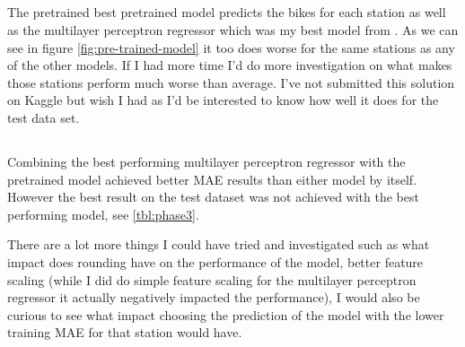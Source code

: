 \documentclass[a4paper]{article}
\begin{document}
    \subsection*{}
    The pretrained best pretrained model predicts the bikes for each station as well as the multilayer perceptron regressor
    which was my best model from .
    As we can see in figure \ref{fig:pre-trained-model} it too does worse for the same stations as any of the other models.
    If I had more time I'd do more investigation on what makes those stations perform much worse than average. I've not
    submitted this solution on Kaggle but wish I had as I'd be interested to know how well it does for the test data set.

    \subsection*{}
    Combining the best performing multilayer perceptron regressor with the pretrained model achieved better MAE results than
    either model by itself. However the best result on the test dataset was not achieved with the best performing model,
    see \ref{tbl:phase3}.

    There are a lot more things I could have tried and investigated such as what impact does rounding have on the performance
    of the model, better feature scaling (while I did do simple feature scaling for the multilayer perceptron regressor it actually
    negatively impacted the performance), I would also be curious to see what impact choosing the prediction of the model
    with the lower training MAE for that station would have.





    
    
\end{document}
